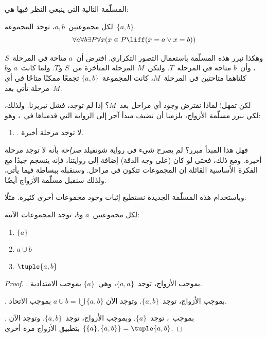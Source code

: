 \documentclass[../../../include/open-logic-section]{subfiles}
\begin{document}

المسلّمة التالية التي ينبغي النظر فيها هي:

\begin{axiom}[الأزواج]
لكل مجموعتين~$a,b$، توجد المجموعة~$\{a,b\}$.
\[
	\forall a \forall b \exists P \forall x (x \in P \liff (x = a \lor x = b))
\]
\end{axiom}

وهكذا نبرر هذه المسلّمة باستعمال التصور التكراري. افترض أن~$a$ متاحة
في المرحلة~$S$، وأن~$b$ متاحة في المرحلة~$T$. ولتكن~$M$ المرحلة
المتأخرة من~$S$ و$T$. ولما كانت~$a$ و$b$ كلتاهما متاحتين في
المرحلة~$M$، كانت المجموعة~$\{a,b\}$ تجمعًا ممكنًا متاحًا في أي مرحلة
تأتي بعد~$M$.

لكن تمهل!{} لماذا نفترض وجود أي مراحل بعد~$M$؟ إذا لم توجد، فشل
تبريرنا. ولذلك، لكي نبرر مسلّمة الأزواج، يلزمنا أن نضيف مبدأ آخر إلى
الرواية التي قدمناها في~، وهو:
\begin{enumerate}
	\item[] \stagessucc. لا توجد مرحلة أخيرة.
\end{enumerate}
فهل هذا المبدأ مبرر؟ لم يصرح شيء في رواية شونفيلد \emph{صراحة} بأنه
لا توجد مرحلة أخيرة. ومع ذلك، فحتى لو كان (على وجه الدقة) إضافة إلى
روايتنا، فإنه ينسجم جيدًا مع الفكرة الأساسية القائلة إن المجموعات
تتكون في مراحل. وسنقبله ببساطة فيما يأتي، ولذلك سنقبل مسلّمة الأزواج
أيضًا.

وباستخدام هذه المسلّمة الجديدة نستطيع إثبات وجود مجموعات أخرى كثيرة.
مثلًا:

\begin{prop}
لكل مجموعتين~$a$ و$b$، توجد المجموعات الآتية:
	\begin{enumerate}
		\item{} $\{a\}$
		\item{} $a \cup b$
		\item{} $\tuple{a, b}$
	\end{enumerate}
\end{prop}

\begin{proof}
. بموجب الأزواج، توجد~$\{a, a\}$، وهي~$\{a\}$
بموجب الامتدادية.

. بموجب الأزواج، توجد~$\{a, b\}$. وتوجد الآن
$a \cup b = \bigcup \{a, b\}$ بموجب الاتحاد.

. بموجب~، توجد~$\{a\}$. وبموجب الأزواج،
توجد~$\{a,b\}$. وتوجد الآن
$\{\{a\}, \{a, b\}\} = \tuple{a, b}$ بتطبيق الأزواج مرة أخرى.
\end{proof}
\end{document}
